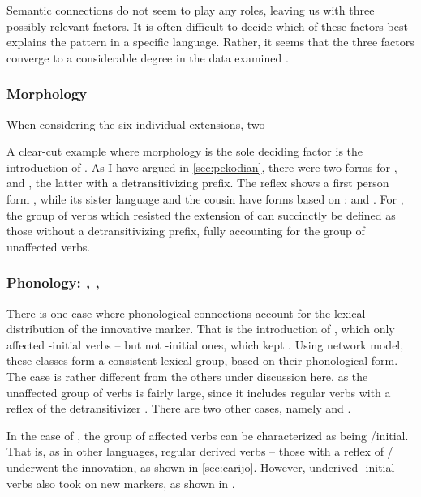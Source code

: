 Semantic connections do not seem to play any roles, leaving us with three possibly relevant factors.
It is often difficult to decide which of these factors best explains the pattern in a specific language.
Rather, it seems that the three factors converge to a considerable degree in the data examined .

\subsubsection{Morphology}
\label{sec:morphology}
When considering the six individual extensions, two 

A clear-cut example where morphology is the sole deciding factor is the introduction of \PPek {}.
As I have argued in \cref{sec:pekodian}, there were two forms for ,  and , the latter with a detransitivizing prefix.
The \arara reflex shows a first person form , while its sister language \ikpeng and the cousin \bakairi have forms based on :  and .
For \PPek, the group of verbs which resisted the extension of  can succinctly be defined as those without a detransitivizing prefix, fully accounting for the group of unaffected verbs.

\subsubsection{Phonology: \akuriyo, \carijo, \yukpa}
\label{sec:phonology}
There is one case where phonological connections account for the lexical distribution of the innovative marker.
That is the introduction of \akuriyo {}, which only affected -initial verbs -- but not -initial ones, which kept  .
Using  network model, these classes form a consistent lexical group, based on their phonological form.
The \akuriyo case is rather different from the others under discussion here, as the unaffected group of verbs is fairly large, since it includes regular  verbs with a reflex of the detransitivizer .
There are two other cases, namely \carijo {}  and \yukpa {} .

In the case of \carijo, the group of affected verbs can be characterized as being /initial.
That is, as in other languages, regular derived  verbs -- those with a reflex of / underwent the innovation, as shown in \cref{sec:carijo}.
However, underived -initial  verbs also took on new markers, as shown in .

